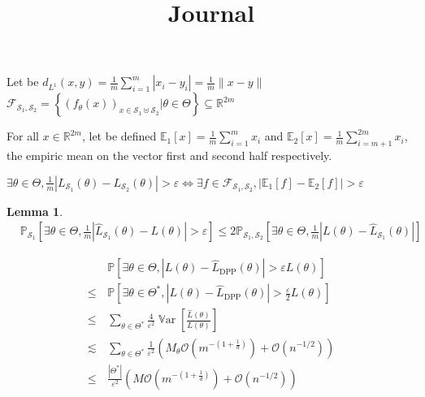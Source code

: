 \documentclass{article} %
\title{Journal}
\renewcommand{\epsilon}{\varepsilon}
\newcommand{\RR}{\mathbb{R}}
\newcommand{\PP}{\mathbb{P}}
\newcommand{\EE}{\mathbb{E}}
\newcommand{\OO}{\mathcal{O}}
\newcommand{\Var}{\operatorname{\mathbb V ar}}
\newcommand{\1}{\mathds{1}} %
\newtheorem{lemma}{Lemma}
\theoremstyle{definition} %
\begin{document}
	
\maketitle
\tableofcontents
	





\vspace{5cm}


Let be $d_{L^1}(x ,y) = \frac 1 m \sum_{i=1}^m |x_i - y_i| = \frac{1}{m} \lVert x- y \rVert$
$\mathcal{F}_{\mathcal{S}_1, \mathcal{S}_2} = \left\{(f_\theta(x))_{x\in \mathcal{S}_1 \uplus \mathcal{S}_2} | \theta \in \Theta \right\} \subseteq \RR^{2m}$	

For all $x \in \RR^{2m}$, let be defined $\EE_1[x] = \frac{1}{m} \sum_{i=1}^{m} x_i$ and $\EE_2[x] = \frac{1}{m} \sum_{i=m+1}^{2m} x_i$, the empiric mean on the vector first and second half respectively.

$\exists \theta \in \Theta,  \frac 1 m | L_{\mathcal{S}_1}(\theta)- L_{\mathcal{S}_2}(\theta)|>\epsilon \iff \exists f \in \mathcal{F}_{\mathcal{S}_1, \mathcal{S}_2}, |\EE_1[f] - \EE_2[f]| > \epsilon$
\begin{lemma}
	\begin{align*}
		&\PP_{\mathcal{S}_1} \left[ \exists \theta \in \Theta,  \frac 1 m |\hat L_{\mathcal{S}_1}(\theta)- L(\theta)|>\epsilon \right] \leq
		2 \PP_{\mathcal{S}_1, \mathcal{S}_2} \left[ \exists \theta \in \Theta,  \frac 1 m |L(\theta)-\hat L_{\mathcal{S}_1}(\theta)|\right] 
	\end{align*}
\end{lemma}

\begin{align*}
	&\PP \left[ \exists \theta \in \Theta,  |L(\theta)-\hat L_{\textrm{DPP}}(\theta)|>\epsilon L(\theta)\right] \\
	\leq \,&\PP \left[ \exists \theta \in \Theta^*,  |L(\theta)-\hat L_{\textrm{DPP}}(\theta)|>\frac{\epsilon}{2} L(\theta)\right] \\
	\leq &\sum_{\theta \in \Theta^*} \frac{4}{\epsilon^2} \Var[\frac{\hat L(\theta)}{L(\theta)}] \\
	\lesssim &\sum_{\theta \in \Theta^*} \frac{1}{\epsilon^2}( M_\theta \OO(m^{-(1+\frac 1 d)}) + \OO(n^{-1/2})) \\
	\leq &\frac{|\Theta^*|}{\epsilon^2} (M \OO(m^{-(1+\frac 1 d)}) + \OO(n^{-1/2}))
\end{align*}
\end{document}
